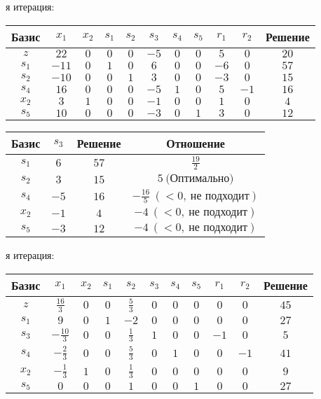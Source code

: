 \documentclass{article}%
\begin{document}
\begin{flushleft}
\newline%
\newline%
я итерация: %
\newline%
\newline%
\renewcommand{\arraystretch}{1.3}%
\begin{tabular}{|c|ccccccccc|c|}%
\hline%
Базис&$x_{1}$&$x_{2}$&$s_{1}$&$s_{2}$&$s_{3}$&$s_{4}$&$s_{5}$&$r_{1}$&$r_{2}$&Решение\\%
\hline%
$z$&$22$&$0$&$0$&$0$&$-5$&$0$&$0$&$5$&$0$&$20$\\%
\hline%
$s_{1}$&$-11$&$0$&$1$&$0$&$6$&$0$&$0$&$-6$&$0$&$57$\\%
$s_{2}$&$-10$&$0$&$0$&$1$&$3$&$0$&$0$&$-3$&$0$&$15$\\%
$s_{4}$&$16$&$0$&$0$&$0$&$-5$&$1$&$0$&$5$&$-1$&$16$\\%
$x_{2}$&$3$&$1$&$0$&$0$&$-1$&$0$&$0$&$1$&$0$&$4$\\%
$s_{5}$&$10$&$0$&$0$&$0$&$-3$&$0$&$1$&$3$&$0$&$12$\\%
\hline%
\end{tabular}%
\newline%
\newline%
\newline%
\begin{tabular}{|cccc|}%
\hline%
Базис&$s_{3}$&Решение&Отношение\\%
\hline%
$s_{1}$&$6$&$57$&$\frac{19}{2}$\\%
$s_{2}$&$3$&$15$&$5\: \text{(Оптимально)}$\\%
$s_{4}$&$-5$&$16$&$-\frac{16}{5}\: (< 0, \: \text{не подходит})$\\%
$x_{2}$&$-1$&$4$&$-4\: (< 0, \: \text{не подходит})$\\%
$s_{5}$&$-3$&$12$&$-4\: (< 0, \: \text{не подходит})$\\%
\hline%
\end{tabular}%
\newline%
\newline%
я итерация: %
\newline%
\newline%
\renewcommand{\arraystretch}{1.3}%
\begin{tabular}{|c|ccccccccc|c|}%
\hline%
Базис&$x_{1}$&$x_{2}$&$s_{1}$&$s_{2}$&$s_{3}$&$s_{4}$&$s_{5}$&$r_{1}$&$r_{2}$&Решение\\%
\hline%
$z$&$\frac{16}{3}$&$0$&$0$&$\frac{5}{3}$&$0$&$0$&$0$&$0$&$0$&$45$\\%
\hline%
$s_{1}$&$9$&$0$&$1$&$-2$&$0$&$0$&$0$&$0$&$0$&$27$\\%
$s_{3}$&$-\frac{10}{3}$&$0$&$0$&$\frac{1}{3}$&$1$&$0$&$0$&$-1$&$0$&$5$\\%
$s_{4}$&$-\frac{2}{3}$&$0$&$0$&$\frac{5}{3}$&$0$&$1$&$0$&$0$&$-1$&$41$\\%
$x_{2}$&$-\frac{1}{3}$&$1$&$0$&$\frac{1}{3}$&$0$&$0$&$0$&$0$&$0$&$9$\\%
$s_{5}$&$0$&$0$&$0$&$1$&$0$&$0$&$1$&$0$&$0$&$27$\\%
\hline%
\end{tabular}%
\newline%
\end{flushleft}%
\end{document}
